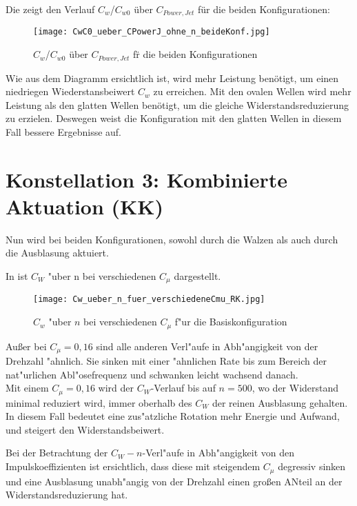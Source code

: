 Die  zeigt den Verlauf $C_{w}$/$C_{w0}$ \"uber $C_{Power,Jet}$  f\"ur die beiden Konfigurationen:
\begin{figure}[h]
	\centering
	\texttt{[image: CwC0\_ueber\_CPowerJ\_ohne\_n\_beideKonf.jpg]}
	\caption{$C_{w}$/$C_{w0}$  \"uber $C_{Power,Jet}$ f\"r die beiden Konfigurationen}
	\label{fig:Cw/Cw0-CpJet_Konf1+2}
\end{figure}

Wie aus dem Diagramm ersichtlich ist, wird mehr Leistung ben\"otigt, um einen niedriegen Wiederstansbeiwert $C_{w}$  zu erreichen. Mit den ovalen Wellen wird mehr Leistung als den glatten Wellen ben\"otigt, um die gleiche Widerstandsreduzierung zu erzielen. Deswegen weist die Konfiguration mit den glatten Wellen in diesem Fall bessere Ergebnisse auf.
\newpage

\section{Konstellation 3: Kombinierte Aktuation (KK)}
\label{s:kombinierteAkt}
Nun wird bei beiden Konfigurationen, sowohl durch die Walzen als auch durch die Ausblasung aktuiert.

In  ist $C_{W}$ "uber n bei verschiedenen $C_{\mu}$ dargestellt.

\begin{figure}[h]
	\centering
	\texttt{[image: Cw\_ueber\_n\_fuer\_verschiedeneCmu\_RK.jpg]}
	\caption{$C_{w}$ "uber $n$ bei verschiedenen $C_{\mu}$ f"ur die Basiskonfiguration}
	\label{fig:Cw/n bei Cmu RK}
\end{figure}

Au\ss{}er bei $C_{\mu}= 0,16$ sind alle anderen Verl"aufe in Abh"angigkeit von der Drehzahl "ahnlich.
Sie sinken mit einer "ahnlichen Rate bis zum Bereich der nat"urlichen Abl"osefrequenz und schwanken leicht wachsend danach.\\Mit einem $C_{\mu}= 0,16$ wird der $C_{W}$-Verlauf bis auf $n= 500$, wo der Widerstand minimal reduziert wird, immer oberhalb des $C_{W}$ der reinen Ausblasung gehalten. In diesem Fall bedeutet eine zus"atzliche Rotation mehr Energie und Aufwand, und steigert den Widerstandsbeiwert.

Bei der Betrachtung der $C_{W}-n$-Verl"aufe in Abh"angigkeit von den Impulskoeffizienten ist ersichtlich, dass diese mit steigendem $C_{\mu}$ degressiv sinken und eine Ausblasung unabh"angig von der Drehzahl einen gro\ss{}en ANteil an der Widerstandsreduzierung hat.

